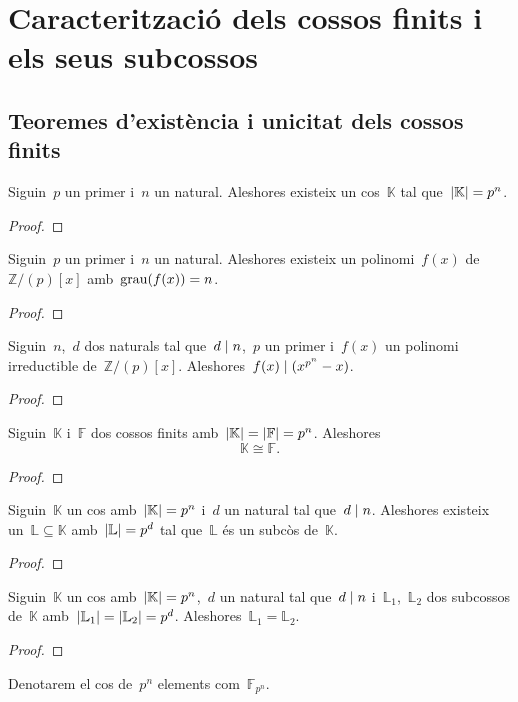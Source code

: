 \documentclass[../../main.tex]{subfiles}
\begin{document}
\section{Caracterització dels cossos finits i els seus subcossos}
	\subsection{Teoremes d'existència i unicitat dels cossos finits}
	\begin{theorem}
		Siguin~\(p\) un primer i~\(n\) un natural.
		Aleshores existeix un cos~\(\mathbb{K}\) tal que~\(\abs{\mathbb{K}}=p^{n}\).
		\begin{proof}
		\end{proof}
	\end{theorem}
	\begin{corollary}
		Siguin~\(p\) un primer i~\(n\) un natural.
		Aleshores existeix un polinomi~\(f(x)\) de~\(\mathbb{Z}/(p)[x]\) amb~\(\operatorname{grau}(f(x))=n\).
		\begin{proof}
		\end{proof}
	\end{corollary}
	\begin{lemma}
		Siguin~\(n\),~\(d\) dos naturals tal que~\(d\mathrel{|} n\),~\(p\) un primer i~\(f(x)\) un polinomi irreductible de~\(\mathbb{Z}/(p)[x]\).
		Aleshores~\(f(x)\mathrel{|}(x^{p^{n}}-x)\).
		\begin{proof}
		\end{proof}
	\end{lemma}
	\begin{theorem}
		Siguin~\(\mathbb{K}\) i~\(\mathbb{F}\) dos cossos finits amb~\(\abs{\mathbb{K}}=\abs{\mathbb{F}}=p^{n}\).
		Aleshores %
		\[
		    \mathbb{K}\cong\mathbb{F}.
		\]
		\begin{proof}
		\end{proof}
	\end{theorem}
	\begin{theorem}
		Siguin~\(\mathbb{K}\) un cos amb~\(\abs{\mathbb{K}}=p^{n}\) i~\(d\) un natural tal que~\(d\mathrel{|} n\).
		Aleshores existeix un~\(\mathbb{L}\subseteq\mathbb{K}\) amb~\(\abs{\mathbb{L}}=p^{d}\) tal que~\(\mathbb{L}\) és un subcòs de~\(\mathbb{K}\).
		\begin{proof}
		\end{proof}
	\end{theorem}
	\begin{theorem}
		Siguin~\(\mathbb{K}\) un cos amb~\(\abs{\mathbb{K}}=p^{n}\),~\(d\) un natural tal que~\(d\mathrel{|} n\) i~\(\mathbb{L}_{1}\),~\(\mathbb{L}_{2}\) dos subcossos de~\(\mathbb{K}\) amb~\(\abs{\mathbb{L}_{1}}=\abs{\mathbb{L}_{2}}=p^{d}\).
		Aleshores~\(\mathbb{L}_{1}=\mathbb{L}_{2}\).
		\begin{proof}
		\end{proof}
	\end{theorem}
	\begin{notation}
		Denotarem el cos de~\(p^{n}\) elements com~\(\mathbb{F}_{p^{n}}\).
	\end{notation}
\end{document}
